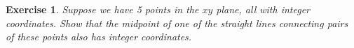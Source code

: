\documentclass{article}
\theoremstyle{plain}
\newtheorem{Q}{Exercise}{\bfseries}{\upshape}
\begin{document}
\begin{Q}
Suppose we have 5 points in the $xy$ plane, all with integer coordinates. Show that the midpoint of one of the straight lines connecting pairs of these points also has integer coordinates.
\end{Q}
\begin{comment}
\textbf{Solution:}
Given two points, $(x_1,y_1)$ and $(x_2,y_2)$, the midpoint is $(\frac{x_1+x_2}{2},\frac{y_1+y_2}{2})$. So, to have a midpoint with integer coordinates we require $x_1+x_2$ and $y_1+y_2$ to both be even. The \emph{parity} of an integer is another word for saying whether it is odd or even. Now, $x_1+x_2$ is even if and only if the parity of $x_1$ is the same as the parity of $x_2$. The same is true for $y_1+y_2$. So the exact values of the coordinates for each point is not important, just their parities. For a point, there are four possible parity combinations: (odd, odd), (odd, even), (even, odd), (even, even). So, if we have five points, then, by the pigeon hole principle, at least two of the points must have the same parity in each coordinate. This will produce a midpoint with integer coordinates as required. 
\end{comment}
\end{document}
